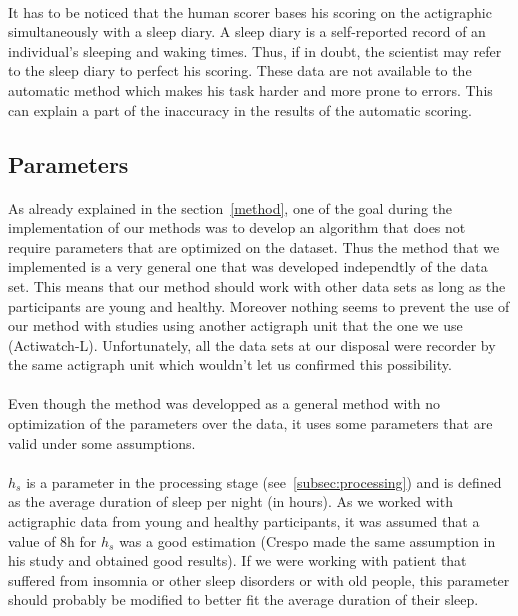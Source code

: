 \documentclass[a4paper,12pt]{article}
\begin{document}
\paragraph{}
It has to be noticed that the human scorer bases his scoring on the actigraphic simultaneously with a sleep diary. A sleep diary is a self-reported record of an individual's sleeping and waking times. Thus, if in doubt, the scientist may refer to the sleep diary to perfect his scoring. These data are not available to the automatic method which makes his task harder and more prone to errors. This can explain a part of the inaccuracy in the results of the automatic scoring.

\subsection{Parameters}

\paragraph{}
As already explained in the section~\ref{method}, one of the goal during the implementation of our methods was to develop an algorithm that does not require parameters that are optimized on the dataset. Thus the method that we implemented is a very general one that was developed independtly of the data set. This means that our method should work with other data sets as long as the participants are young and healthy. Moreover nothing seems to prevent the use of our method with studies using another actigraph unit that the one we use (Actiwatch-L). Unfortunately, all the data sets at our disposal were recorder by the same actigraph unit which wouldn't let us confirmed this possibility.

\paragraph{}
Even though the method was developped as a general method with no optimization of the parameters over the data, it uses some parameters that are valid under some assumptions.

\paragraph{}
$h_s$ is a parameter in the processing stage (see~\ref{subsec:processing}) and is defined as the average duration of sleep per night (in hours). As we worked with actigraphic data from young and healthy participants, it was assumed that a value of 8h for $h_s$ was a good estimation (Crespo made the same assumption in his study and obtained good results). If we were working with patient that suffered from insomnia or other sleep disorders or with old people, this parameter should probably be modified to better fit the average duration of their sleep.
\end{document}
